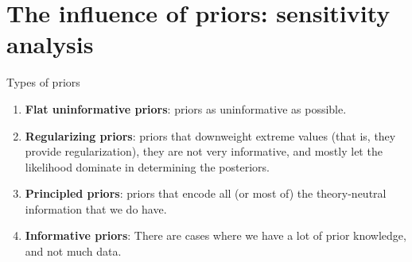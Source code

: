 \documentclass[12pt,ignorenonframetext,aspectratio=169]{beamer}
\begin{document}
\hypertarget{sec:sensitivity}{%
\section{The influence of priors: sensitivity analysis}\label{sec:sensitivity}}

\begin{frame}{Types of priors}
\protect\hypertarget{types-of-priors}{}

\begin{enumerate}
\item
  \textbf{Flat uninformative priors}: priors as uninformative as possible. 
\item
  \textbf{Regularizing priors}: priors that downweight extreme values (that is, they provide regularization), they are not very informative, and mostly let the likelihood dominate in determining the posteriors. 
\item
  \textbf{Principled priors}: priors that encode all (or most of) the theory-neutral information that we do have. 
\item
  \textbf{Informative priors}: There are cases where we have a lot of prior knowledge, and not much data. 
\end{enumerate}

\end{frame}
\end{document}
